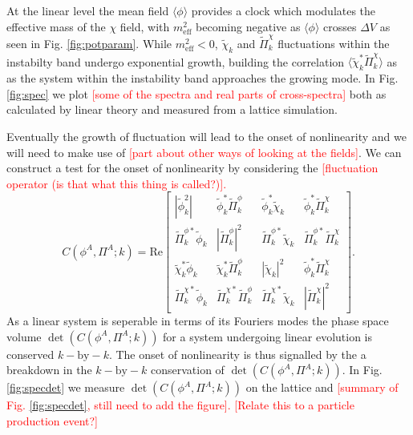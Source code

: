 At the linear level the mean field $\langle\phi\rangle$ provides a clock which modulates the effective mass of the $\chi$ field, with $m^2_\mathrm{eff}$ becoming negative as $\langle\phi\rangle$ crosses $\Delta V$ as seen in Fig. \ref{fig:potparam}. While $m^2_\mathrm{eff}<0$, $\tilde{\chi}_k$ and $\tilde{\Pi}^\chi_k$ fluctuations within the instabilty band undergo exponential growth, building the correlation $\langle\tilde{\chi}^*_k\tilde{\Pi}^\chi_k\rangle$ as as the system within the instability band approaches the growing mode. In Fig. \ref{fig:spec} we plot \textcolor{red}{[some of the spectra and real parts of cross-spectra]} both as calculated by linear theory and measured from a lattice simulation.

\Fspec

Eventually the growth of fluctuation will lead to the onset of nonlinearity and we will need to make use of \textcolor{red}{[part about other ways of looking at the fields]}. We can construct a test for the onset of nonlinearity by considering the \textcolor{red}{[fluctuation operator (is that what this thing is called?)].}
\begin{equation}
  C(\phi^A,\Pi^A;k) =
  \mathrm{Re}\left[
    \begin{matrix}
      |\tilde{\phi}_k^2| & \tilde{\phi}_k^*\tilde{\Pi}^\phi_k & \tilde{\phi}_k^*\tilde{\chi}_k & \tilde{\phi}_k^*\tilde{\Pi}^\chi_k \\
      \tilde{\Pi}^{\phi *}_k\tilde{\phi}_k & |\tilde{\Pi}^\phi_k|^2 & \tilde{\Pi}^{\phi *}_k\tilde{\chi}_k & \tilde{\Pi}^{\phi *}_k\tilde{\Pi}^\chi_k \\
      \tilde{\chi}_k^*\tilde{\phi}_k & \tilde{\chi}_k^*\tilde{\Pi}^\phi_k & |\tilde{\chi}_k|^2 & \tilde{\phi}_k^*\tilde{\Pi}^\chi_k \\
      \tilde{\Pi}^{\chi *}_k\tilde{\phi}_k & \tilde{\Pi}^{\chi *}_k\tilde{\Pi}^\phi_k & \tilde{\Pi}^{\chi *}_k\tilde{\chi}_k & |\tilde{\Pi}^\chi_k|^2
    \end{matrix}
  \right].
\end{equation}
As a linear system is seperable in terms of its Fouriers modes the phase space volume $\det(C(\phi^A,\Pi^A;k))$ for a system undergoing linear evolution is conserved $k-\text{by}-k$. The onset of nonlinearity is thus signalled by the a breakdown in the $k-\text{by}-k$ conservation of $\det(C(\phi^A,\Pi^A;k))$. In Fig. \ref{fig:specdet} we measure $\det(C(\phi^A,\Pi^A;k))$ on the lattice and \textcolor{red}{[summary of Fig. \ref{fig:specdet}, still need to add the figure].}
\textcolor{red}{[Relate this to a particle production event?]}

